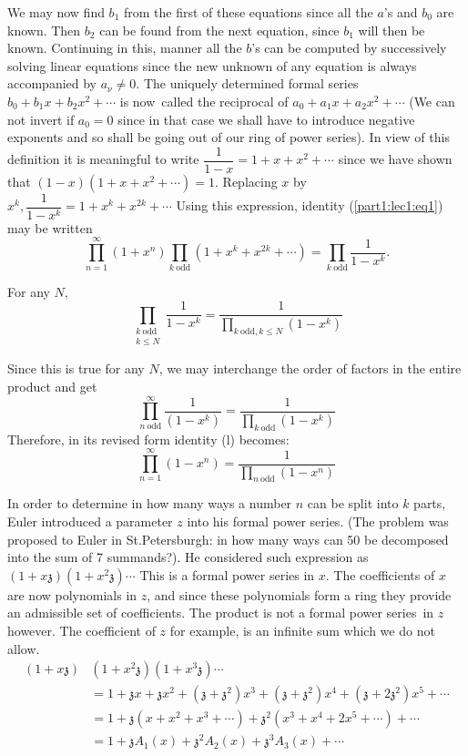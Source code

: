 We may now find $b_1$ from the first of these equations since all the
$a$'s and $b_0$ are known. Then $b_2$ can be found from the next
equation, since $b_1$ will then be known. Continuing in this, manner
all the $b$'s can be computed by successively solving linear equations
since the new unknown of any equation is always accompanied by $a_\nu
\neq 0$. The uniquely determined formal series $b_0 + b_1x + b_2x^2 +
\cdots$ is now\pageoriginale\  called the reciprocal of
$a_0+a_1x+a_2x^2+\cdots$ (We can not invert if $a_0=0$ since in that
case we shall have to introduce negative exponents and so shall be
going out of our ring of power series). In view of this definition it
is meaningful to write $\dfrac{1}{1-x} = 1 +x+ x^2 + \cdots$ since we
have shown that $(1-x)(1+x+x^2+ \cdots)=1$. Replacing $x$ by $x^k,
\dfrac{1}{1-x^k} =1 +x^k + x^{2k}+ \cdots$ Using this expression,
identity (\ref{part1:lec1:eq1}) may be written
$$
  \prod\limits_{n=1}^\infty \left(1+x^{n}\right) \prod\limits_{k ~\text{odd}}
  \left(1+x^{k}+x^{2k} +\cdots \right)= \prod\limits_{k~ \text{odd}}
  \dfrac{1}{1-x^k}. 
$$

For any $N$,
$$
\prod_{\substack{k ~\text{odd}\\k \leq N}} \frac{1}{1-x^k} =
\frac{1}{\prod\limits_{k ~\text{odd}, k \leq N} (1- x^k)}
$$

Since this is true for any $N$, we may interchange the order of
factors in the entire product and get
$$
\prod\limits_{n~\text{odd}}^\infty \frac{1}{(1- x^k)}= \frac{1}{\prod\limits_{k
    ~\text{odd}}(1- x^k)} 
$$
Therefore, in its revised form identity (l) becomes:
$$
\prod\limits_{n=1}^\infty (1- x^n)= \frac{1}{\prod\limits_{n
    ~\text{odd}}(1- x^n)} 
$$

In order to determine in how many ways a number $n$ can be split into
$k$ parts, Euler introduced a parameter $z$ into his formal power
series. (The problem was proposed to Euler in St.Petersburgh: in how
many ways can 50 be decomposed into the sum of 7 summands?). He
considered such expression as $(1+ x\mathfrak{z})(1+ x^2\mathfrak{z})\cdots$ This is a
formal power series in $x$. The coefficients of $x$ are now
polynomials in $z$, and since these polynomials form a ring they
provide an admissible set of coefficients. The product is not a formal
power series\pageoriginale\  in $z$ however. The coefficient of $z$ for
example, is an infinite sum which we do not allow.
\begin{align*}
  (1+ x\mathfrak{z})& (1+x^2\mathfrak{z}) (1+x^3\mathfrak{z})\cdots\\
  & = 1+ \mathfrak{z}x+ \mathfrak{z}x^2+
  (\mathfrak{z}+\mathfrak{z}^2)x^3 + (\mathfrak{z}+\mathfrak{z}^2)x^4
  + (\mathfrak{z}+ 2\mathfrak{z}^2)x^5 + \cdots\\
  & = 1+ \mathfrak{z}(x+x^2+x^3+\cdots)
  +\mathfrak{z}^2(x^3+x^4+2x^5+\cdots ) + \cdots\\
  & = 1+ \mathfrak{z} A_1 (x) + \mathfrak{z}^2 A_2 (x) +
  \mathfrak{z}^3 A_3 (x) + \cdots \tag{2}\label{part1:lec1:eq2}
\end{align*}


